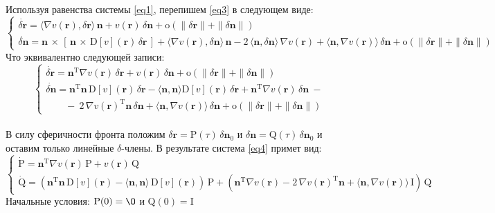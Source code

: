 \documentclass{article}
\newcommand{\bfv}[1]{\mathbf{#1}}
\newcommand{\dd}[1]{\dot{#1}}
\newcommand{\dvp}[3]{#1\,\times\,[\,#2\,\times\,#3\,]}
\newcommand{\dv}[1]{\nabla v(#1)}
\newcommand{\ddv}[1]{\mathrm{D}[v](#1)}
\newcommand{\dr}{\delta \bfv{r}}
\newcommand{\dn}{\delta \bfv{n}}
\newcommand{\om}[1]{\mathrm{o}(#1)}
\newcommand{\dprod}[2]{\langle #1, #2 \rangle}
\newcommand{\T}[1]{#1^\mathrm{T}}
\newcommand{\matr}[1]{\mathrm{#1}}
\begin{document}
Используя равенства системы \eqref{eq1}, перепишем \eqref{eq3} в следующем виде:
\begin{equation*}
\begin{cases}
\dd{\dr} = \dprod{\dv{\bfv{r}}}{\dr}\,\bfv{n} + v(\bfv{r})\,\dn + \om{\|\dr\| + \|\dn\|}\\
\dd{\dn} = \dvp{\bfv{n}}{\bfv{n}}{\ddv{\bfv{r}}\,\dr} + \dprod{\dv{\bfv{r}}}{\dn}\,\bfv{n} - 2\,\dprod{\bfv{n}}{\dn}\,\dv{\bfv{r}} + \dprod{\bfv{n}}{\dv{\bfv{r}}}\,\dn + \om{\|\dr\| + \|\dn\|}
\end{cases}
\end{equation*}
Что эквивалентно следующей записи:
\begin{equation} \label{eq4}
\begin{cases}
\dd{\dr} = \T{\bfv{n}}\dv{\bfv{r}}\,\dr + v(\bfv{r})\,\dn + \om{\|\dr\| + \|\dn\|}\\
\dd{\dn} = \T{\bfv{n}}\bfv{n}\,\ddv{\bfv{r}}\,\dr - \dprod{\bfv{n}}{\bfv{n}}\ddv{\bfv{r}}\,\dr + \T{\bfv{n}}\dv{\bfv{r}}\,\dn \ - \\ \qquad -\ 2\,\T{\dv{\bfv{r}}}\bfv{n}\,\dn + \dprod{\bfv{n}}{\dv{\bfv{r}}}\,\dn + \om{\|\dr\| + \|\dn\|}
\end{cases}
\end{equation}\\
В силу сферичности фронта положим $\dr = \matr{P}(\tau)\,\dn_0$ и $\dn = \matr{Q}(\tau)\,\dn_0$ и оставим только линейные $\delta$-члены. В результате система \eqref{eq4} примет вид:
\begin{equation} \label{eq5}
\begin{cases}
\dd{\matr{P}} = \T{\bfv{n}}\dv{\bfv{r}}\,\matr{P} + v(\bfv{r})\,\matr{Q}\\
\dd{\matr{Q}} = (\T{\bfv{n}}\bfv{n}\,\ddv{\bfv{r}} - \dprod{\bfv{n}}{\bfv{n}}\,\ddv{\bfv{r}})\,\matr{P} + (\T{\bfv{n}}\dv{\bfv{r}} - 2\,\T{\dv{\bfv{r}}}\bfv{n} + \dprod{\bfv{n}}{\dv{\bfv{r}}}\,\matr{I})\,\matr{Q} 
\end{cases}
\end{equation}
Начальные условия: $\matr{P}(0) = \matr{\O}$ и $\matr{Q}(0) = \matr{I}$
\end{document}

